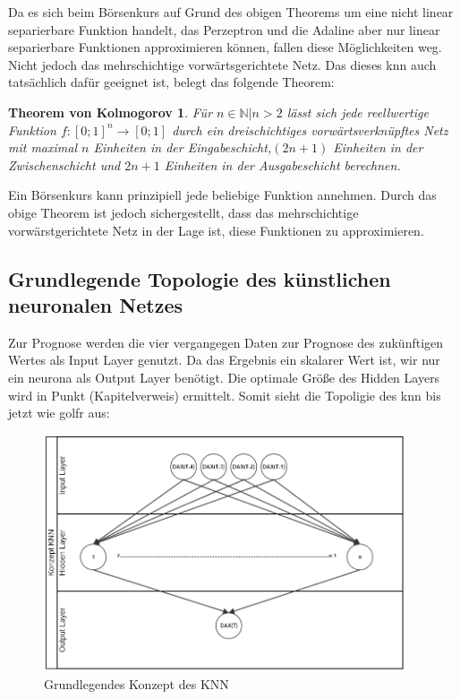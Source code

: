 Da es sich beim Börsenkurs auf Grund des obigen Theorems um eine nicht linear separierbare Funktion handelt, das Perzeptron und die Adaline aber nur linear separierbare Funktionen approximieren können, fallen diese Möglichkeiten weg. Nicht jedoch das mehrschichtige vorwärtsgerichtete Netz. Das dieses \ac{knn} auch tatsächlich dafür geeignet ist, belegt das folgende Theorem:


\newtheorem*{theorem1*}{Theorem von Kolmogorov}
\begin{theorem1*}
Für ${n \in \mathbb{N} | n>2}$ lässt sich jede reellwertige Funktion $f:[0;1]^n\rightarrow[0;1]$ durch ein dreischichtiges vorwärtsverknüpftes Netz mit maximal $n$ Einheiten in der Eingabeschicht,$(2n+1)$ Einheiten in der Zwischenschicht und $2n+1$ Einheiten in der Ausgabeschicht berechnen.
\end{theorem1*}

Ein Börsenkurs kann prinzipiell jede beliebige Funktion annehmen. Durch das obige Theorem ist jedoch sichergestellt, dass das mehrschichtige vorwärstgerichtete Netz in der Lage ist, diese Funktionen zu approximieren.


\subsection{Grundlegende Topologie des künstlichen neuronalen Netzes}
\label{subsection:Grundlegende Topologie des künstlichen neuronalen Netzes}

Zur Prognose werden die vier vergangegen Daten zur Prognose des zukünftigen Wertes als Input Layer genutzt. Da das Ergebnis ein skalarer Wert ist, wir nur ein neurona als Output Layer benötigt. Die optimale Größe des Hidden Layers wird in Punkt (Kapitelverweis) ermittelt. Somit sieht die Topoligie des knn bis jetzt wie golfr aus:

\begin{figure}[H]
\centering
		\includegraphics[width=0.95\textwidth]{KonzeptKNN.PNG}
	\caption{Grundlegendes Konzept des KNN}
	\label{fig:Grundlegendes Konzept des KNN}
\end{figure}


